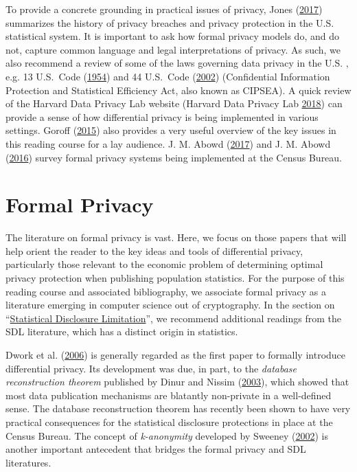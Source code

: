 \documentclass[]{article}
\begin{document}
To provide a concrete grounding in practical issues of privacy, Jones
(\protect\hyperlink{ref-jones:2017}{2017}) summarizes the history of
privacy breaches and privacy protection in the U.S. statistical system.
It is important to ask how formal privacy models do, and do not, capture
common language and legal interpretations of privacy. As such, we also
recommend a review of some of the laws governing data privacy in the
U.S. , e.g. 13 U.S.~Code (\protect\hyperlink{ref-title13}{1954}) and 44
U.S.~Code (\protect\hyperlink{ref-cipsea}{2002}) (Confidential
Information Protection and Statistical Efficiency Act, also known as
CIPSEA). A quick review of the Harvard Data Privacy Lab website (Harvard
Data Privacy Lab \protect\hyperlink{ref-Harvard:DataPrivacyLab}{2018})
can provide a sense of how differential privacy is being implemented in
various settings. Goroff (\protect\hyperlink{ref-Goroff2015}{2015}) also
provides a very useful overview of the key issues in this reading course
for a lay audience. J. M. Abowd
(\protect\hyperlink{ref-Abowd:JPC:2017}{2017}) and J. M. Abowd
(\protect\hyperlink{ref-abowd:fcsm:2016}{2016}) survey formal privacy
systems being implemented at the Census Bureau.

\hypertarget{formal-privacy}{\section{Formal
Privacy}\label{formal-privacy}}

The literature on formal privacy is vast. Here, we focus on those papers
that will help orient the reader to the key ideas and tools of
differential privacy, particularly those relevant to the economic
problem of determining optimal privacy protection when publishing
population statistics. For the purpose of this reading course and
associated bibliography, we associate formal privacy as a literature
emerging in computer science out of cryptography. In the section on
``\protect\hyperlink{statistical-disclosure-limitation}{Statistical
Disclosure Limitation}'', we recommend additional readings from the SDL
literature, which has a distinct origin in statistics.

Dwork et al. (\protect\hyperlink{ref-Dworketal:2006}{2006}) is generally
regarded as the first paper to formally introduce differential privacy.
Its development was due, in part, to the \emph{database reconstruction
theorem} published by Dinur and Nissim
(\protect\hyperlink{ref-Dinur:2003:RIW:773153.773173}{2003}), which
showed that most data publication mechanisms are blatantly non-private
in a well-defined sense. The database reconstruction theorem has
recently been shown to have very practical consequences for the
statistical disclosure protections in place at the Census Bureau. The
concept of \emph{k-anonymity} developed by Sweeney
(\protect\hyperlink{ref-sweeney:2002}{2002}) is another important
antecedent that bridges the formal privacy and SDL literatures.
\end{document}

